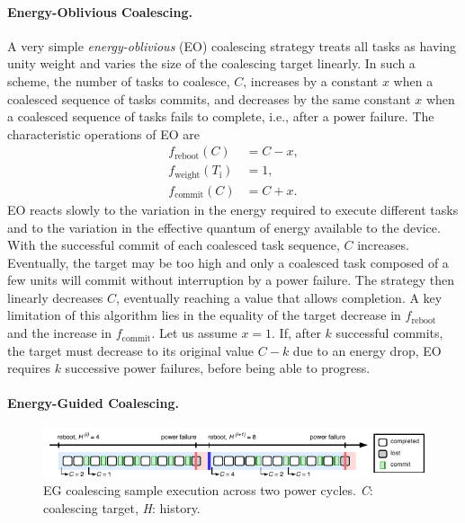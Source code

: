 \paragraph{Energy-Oblivious Coalescing.}
\label{subsec:energyBlind}
 
A very simple {\em energy-oblivious} (EO) coalescing strategy treats all tasks as having unity weight and varies the size of the coalescing target linearly. In such a scheme, the number of tasks to coalesce, $C$, increases by a constant $x$ when a coalesced sequence of tasks commits, and decreases by the same constant $x$ when a coalesced sequence of tasks fails to complete, i.e., after a power failure. The characteristic operations of EO are
%
\begin{equation}
	\begin{split}
		f_\text{reboot}(C) & = C - x, \\
		f_\text{weight}(T_\text{i}) & =  1, \\
		f_\text{commit}(C) & = C + x.
	\end{split}
	\label{eq:eo}
\end{equation}
%
EO reacts slowly to the variation in the energy required to execute different tasks and to the variation in the effective quantum of energy available to the device. With the successful commit of each coalesced task sequence, $C$ increases. Eventually, the target may be too high and only a coalesced task composed of a few units will commit without interruption by a power failure. The strategy then linearly decreases $C$, eventually reaching a value that allows completion. A key limitation of this algorithm lies in the equality of the target decrease in $f_\text{reboot}$ and the increase in $f_\text{commit}$. Let us assume $x=1$. If, after $k$ successful commits, the target must decrease to its original value $C-k$ due to an energy drop, EO requires $k$ successive power failures, before being able to progress.

\paragraph{Energy-Guided Coalescing.}
\label{subsec:energyAware}

\begin{figure}
    \includegraphics[width=\linewidth]{figures/hg-coal-horiz.pdf}
    \caption{EG coalescing sample execution across two power cycles. \emph{C}: coalescing target, \emph{H}: history.}
    \label{fig:hg-coal}
\end{figure}

